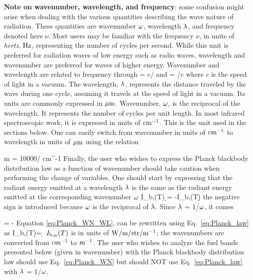 \textbf{Note on wavenumber, wavelength, and frequency}: some confusion might arise when dealing with the various quantities
describing the wave nature of radiation. These quantities are wavenumber $\omega$, wavelength $\lambda$, and frequency denoted here
$\nu$. Most users may be familiar with the frequency $\nu$, in units of \textit{hertz}, ${\rm Hz}$, representing the number of
cycles per second. While this unit is preferred for radiation waves of low energy such as radio waves, wavelength and wavenumber
are preferred for waves of higher energy. Wavenumber and wavelength are related to frequency through \cite{Penner:1959}
\be
 \la = c/\nu \: \: \rm{and} \: \: \om = \nu /c
\ee
where $c$ is the speed of light in a vacuum. The wavelength, $\lambda$, represents the distance traveled by the wave during one cycle,
assuming it travels at the speed of light in a vacuum. Its units are commonly expressed in ${\rm \mu m}$. Wavenumber, $\omega$, is
the reciprocal of the wavelength. It represents the number of cycles per unit length. In most infrared spectroscopic work, it is
expressed in units of ${\rm cm^{-1}}$. This is the unit used in the sections below. One can  easily switch from wavenumber in
units of ${\rm cm^{-1}}$ to wavelength in units of ${\rm \mu m}$ using the relation

\be
  \la \; {\rm \mu m}  \; = 10000/\om \; \; {\rm cm^{-1}}
\ee
Finally, the user who wishes to express the Planck blackbody distribution law
as a function of wavenumber should take caution when performing the change of variables. One should start by expressing that the
radiant energy emitted
at a wavelength $\lambda$ is the same as the radiant energy emitted at the corresponding wavenumber $\omega$ \cite{Tien:1968}
\be \label{eq:Planck_WN_WL}
I_{\rm b,\la}(T) \d \la = -I_{\rm b,\om}(T)\d \om
\ee
the negative sign is introduced because $\omega$ is the reciprocal of $\lambda$.
Since $\lambda$ = 1/$\omega$, it comes

\be
\dfrac{\d \la}{\d \om} = -
\ee
Equation \ref{eq:Planck_WN_WL},
can be rewritten using Eq.~\ref{eq:Planck_law} as
\be\label{eq:Planck_WN}
  I_{\rm b,\om}(T)\d \om = \d \om
\ee
$I_{\rm b,\omega}(T)$ is in units of $\rm{W/m/str/m^{-1}}$; the wavenumbers are converted from $\rm{cm^{-1}}$ to $\rm{m^{-1}}$.
The user who wishes to analyze the fuel bands presented below (given in wavenumber) with the Planck blackbody distribution law
should use Eq.~\ref{eq:Planck_WN} but should NOT use Eq.~\ref{eq:Planck_law} with $\lambda$ = 1/$\omega$.


